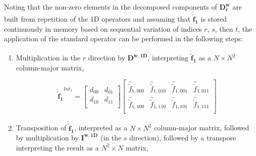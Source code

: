 \documentclass[12pt,Bold,letterpaper,TexShade]{mcgilletdclass}
\numberwithin{equation}{section}
\newcommand{\mat}[1]{\bm{{#1}}}
\newcommand{\vect}[1]{\bm{{#1}}}
\begin{document}
Noting that the non-zero elements in the decomposed components of $\mat{D^{w}_r}$ are built from repetition of the 1D operators and assuming that $\vect{\hat{\tilde{f}}_{1}}$ is stored continuously in memory based on sequential variation of indices $r$, $s$, then $t$, the application of the standard operator can be performed in the following steps:

\begin{enumerate}
\item Multiplication in the $r$ direction by $\mat{D^{w,1D}}$, interpreting $\vect{\hat{\tilde{f}}_{1}}$ as a $N \times N^2$ column-major matrix,

\begin{equation} \nonumber
\vect{\hat{\tilde{f}}_{1}}^{Int_1}
=
\begin{bmatrix}
d_{00} & d_{01} \\
d_{10} & d_{11} \\
\end{bmatrix}
\begin{bmatrix}
\hat{\tilde{f}}_{1,000} & \hat{\tilde{f}}_{1,010} & \hat{\tilde{f}}_{1,001} & \hat{\tilde{f}}_{1,011} \\
\hat{\tilde{f}}_{1,100} & \hat{\tilde{f}}_{1,110} & \hat{\tilde{f}}_{1,101} & \hat{\tilde{f}}_{1,111} \\
\end{bmatrix}
\end{equation}

\item Transposition of $\vect{\hat{\tilde{f}}_{1}}$, interpreted as a $N \times N^2$ column-major matrix, followed by multiplication by $\mat{I^{w,1D}}$ (in the $s$ direction), followed by a transpose interpreting the result as a $N^2 \times N$ matrix,


\end{enumerate}
\end{document}
